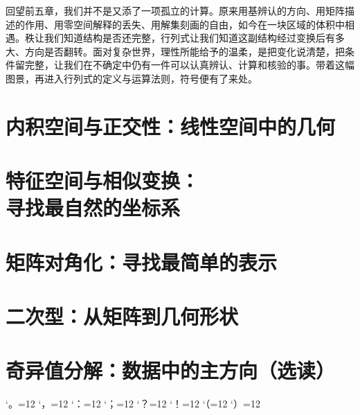 \documentclass[a4paper,12pt,twoside,openany,fontset=none]{ctexbook}
\numberwithin{equation}{chapter}
\begin{document}
回望前五章，我们并不是又添了一项孤立的计算。原来用基辨认的方向、用矩阵描述的作用、用零空间解释的丢失、用解集刻画的自由，如今在一块区域的体积中相遇。秩让我们知道结构是否还完整，行列式让我们知道这副结构经过变换后有多大、方向是否翻转。面对复杂世界，理性所能给予的温柔，是把变化说清楚，把条件留完整，让我们在不确定中仍有一件可以认真辨认、计算和核验的事。带着这幅图景，再进入行列式的定义与运算法则，符号便有了来处。

\par\clearpage
\endgroup
\setcounter{figure}{0}

\chapter{内积空间与正交性：线性空间中的几何}
\label{chap:inner-products}

\chapter[特征空间与相似变换：寻找最自然的坐标系]{特征空间与相似变换：\\寻找最自然的坐标系}
\label{chap:eigenspaces}

\chapter{矩阵对角化：寻找最简单的表示}
\label{chap:diagonalization}

\chapter{二次型：从矩阵到几何形状}
\label{chap:quadratic-forms}

\chapter{奇异值分解：数据中的主方向（选读）}
\label{chap:svd}

\begingroup
\catcode`。=12 \catcode`，=12 \catcode`：=12 \catcode`；=12
\catcode`？=12 \catcode`！=12 \catcode`（=12 \catcode`）=12
\end{document}

